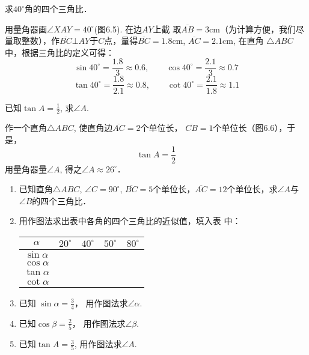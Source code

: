 \begin{example}
      求$40^{\circ}$角的四个三角比．
\end{example}

\begin{solution}
 用量角器画$\angle XAY=40^{\circ}$(图6.5). 在边$AY$上截
取$\overline{AB}=3$cm（为计算方便，我们尽量取整数），作$\overline{BC}\bot AY$于$C$点，量得$\overline{BC}=1.8$cm, $\overline{AC}=2.1$cm, 在直角
$\triangle ABC$中，根据三角比的定义可得：
\[\sin40^{\circ}=\frac{1.8}{3}\approx 0.6,\qquad \cos40^{\circ}=\frac{2.1}{3}\approx 0.7 \]
\[\tan40^{\circ}=\frac{1.8}{2.1}\approx 0.8,\qquad \cot40^{\circ}=\frac{2.1}{1.8}\approx 1.1\]
\end{solution}

\begin{example}
    已知$\tan A=\frac{1}{2}$, 求$\angle A$.
\end{example}

\begin{figure}[htp]
    \centering
{}
    \caption{}
\end{figure}

\begin{solution}
    作一个直角$\triangle ABC$, 使直角边$\overline{AC}=2$个单位长，
$\overline{CB}=1$个单位长（图6.6），于是，
\[\tan A=\frac{1}{2}\]
用量角器量$\angle A$, 得之$\angle A\approx 26^{\circ}$．
\end{solution}

\begin{ex}
\begin{enumerate}
    \item 已知直角$\triangle ABC$, $\angle C=90^{\circ}$, $\overline{BC}=5$个单位长，$\overline{AC}=
    12$个单位长，求$\angle A$与$\angle B$的四个三角比．
    \item 用作图法求出表中各角的四个三角比的近似值，填入表
    中：
\begin{center}
    \begin{tabular}{c|cccc}
\hline
        $\alpha$ & $20^{\circ}$ & $40^{\circ}$ & $50^{\circ}$ & $80^{\circ}$\\
\hline
$\sin\alpha$\\
$\cos\alpha$\\
$\tan\alpha$\\
$\cot\alpha$\\
\hline
    \end{tabular}
\end{center}
\item 已知 $\sin\alpha=\frac{3}{4}$，
用作图法求$\angle\alpha$.
\item 已知$\cos\beta=\frac{2}{5}$，
用作图法求$\angle \beta$.
\item 已知$\tan A=\frac{3}{5}$, 
用作图法求$\angle A$.
\end{enumerate}
\end{ex}

